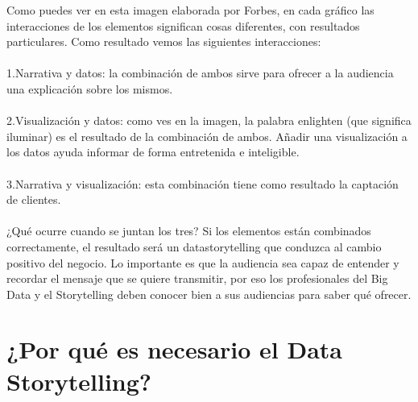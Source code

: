 {{\item{
Como puedes ver en esta imagen elaborada por Forbes, en cada gráfico las interacciones de los elementos significan cosas diferentes, con resultados particulares. Como resultado vemos las siguientes interacciones:
\\\\1.Narrativa y datos: la combinación de ambos sirve para ofrecer a la audiencia una explicación sobre los mismos.
\\\\2.Visualización y datos: como ves en la imagen, la palabra enlighten (que significa iluminar) es el resultado de la combinación de ambos. Añadir una visualización a los datos ayuda informar de forma entretenida e inteligible.
\\\\3.Narrativa y visualización: esta combinación tiene como resultado la captación de clientes.
\\\\¿Qué ocurre cuando se juntan los tres? Si los elementos están combinados correctamente, el resultado será un datastorytelling que conduzca al cambio positivo del negocio. Lo importante es que la audiencia sea capaz de entender y recordar el mensaje que se quiere transmitir, por eso los profesionales del Big Data y el Storytelling deben conocer bien a sus audiencias para saber qué ofrecer.
}
\section{¿Por qué es necesario el Data Storytelling?}

}}
